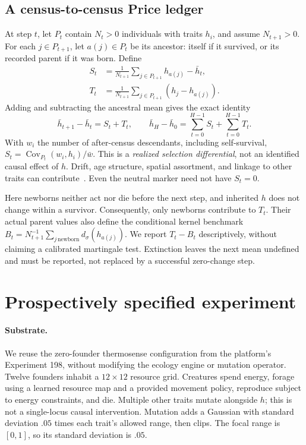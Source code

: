 \documentclass[10pt]{article}
\begin{document}
\subsection{A census-to-census Price ledger}
At step $t$, let $P_t$ contain $N_t>0$ individuals with traits $h_i$, and assume $N_{t+1}>0$. For each $j\in P_{t+1}$, let $a(j)\in P_t$ be its ancestor: itself if it survived, or its recorded parent if it was born. Define
\begin{align}
 S_t&=\frac{1}{N_{t+1}}\sum_{j\in P_{t+1}} h_{a(j)}-\bar h_t,\label{eq:selection}\\
 T_t&=\frac{1}{N_{t+1}}\sum_{j\in P_{t+1}}(h_j-h_{a(j)}).\label{eq:transmission}
\end{align}
Adding and subtracting the ancestral mean gives the exact identity
\begin{equation}\label{eq:price}
 \bar h_{t+1}-\bar h_t=S_t+T_t,
 \qquad \bar h_H-\bar h_0=\sum_{t=0}^{H-1}S_t+\sum_{t=0}^{H-1}T_t.
\end{equation}
With $w_i$ the number of after-census descendants, including self-survival, $S_t=\operatorname{Cov}_{P_t}(w_i,h_i)/\bar w$. This is a \emph{realized selection differential}, not an identified causal effect of $h$. Drift, age structure, spatial assortment, and linkage to other traits can contribute~\cite{okasha}. Even the neutral marker need not have $S_t=0$.

Here newborns neither act nor die before the next step, and inherited $h$ does not change within a survivor. Consequently, only newborns contribute to $T_t$. Their actual parent values also define the conditional kernel benchmark $B_t=N_{t+1}^{-1}\sum_{j\,\mathrm{newborn}}d_\sigma(h_{a(j)})$. We report $T_t-B_t$ descriptively, without claiming a calibrated martingale test. Extinction leaves the next mean undefined and must be reported, not replaced by a successful zero-change step.

\newpage
\section{Prospectively specified experiment}
\paragraph{Substrate.}
We reuse the zero-founder thermosense configuration from the platform's Experiment 198, without modifying the ecology engine or mutation operator. Twelve founders inhabit a $12\times12$ resource grid. Creatures spend energy, forage using a learned resource map and a provided movement policy, reproduce subject to energy constraints, and die. Multiple other traits mutate alongside $h$; this is not a single-locus causal intervention. Mutation adds a Gaussian with standard deviation $.05$ times each trait's allowed range, then clips. The focal range is $[0,1]$, so its standard deviation is $.05$.
\end{document}
